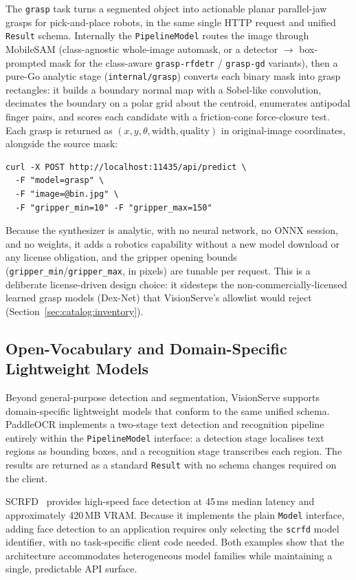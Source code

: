 The \texttt{grasp} task turns a segmented object into actionable planar parallel-jaw grasps for
pick-and-place robots, in the same single HTTP request and unified \texttt{Result} schema.
Internally the \texttt{PipelineModel} routes the image through MobileSAM (class-agnostic
whole-image automask, or a detector $\to$ box-prompted mask for the class-aware
\texttt{grasp-rfdetr} / \texttt{grasp-gd} variants), then a pure-Go analytic stage
(\texttt{internal/grasp}) converts each binary mask into grasp rectangles: it builds a boundary
normal map with a Sobel-like convolution, decimates the boundary on a polar grid about the
centroid, enumerates antipodal finger pairs, and scores each candidate with a friction-cone
force-closure test. Each grasp is returned as $(x,y,\theta,\text{width},\text{quality})$ in
original-image coordinates, alongside the source mask:

{\footnotesize\begin{verbatim}
curl -X POST http://localhost:11435/api/predict \
  -F "model=grasp" \
  -F "image=@bin.jpg" \
  -F "gripper_min=10" -F "gripper_max=150"
\end{verbatim}}

\noindent
Because the synthesizer is analytic, with no neural network, no ONNX session, and no weights, it adds a
robotics capability without a new model download or any license obligation, and the gripper
opening bounds (\texttt{gripper\_min}/\texttt{gripper\_max}, in pixels) are tunable per request.
This is a deliberate license-driven design choice: it sidesteps the non-commercially-licensed
learned grasp models (Dex-Net) that VisionServe's allowlist would reject
(Section~\ref{sec:catalog:inventory}).

\subsection{Open-Vocabulary and Domain-Specific Lightweight Models}
\label{subsec:open-vocab-domain}

Beyond general-purpose detection and segmentation, VisionServe supports
domain-specific lightweight models that conform to the same unified schema. PaddleOCR
\cite{du2020ppocr} implements a two-stage text detection and recognition pipeline
entirely within the \texttt{PipelineModel} interface: a detection stage localises text
regions as bounding boxes, and a recognition stage transcribes each region. The results
are returned as a standard \texttt{Result} with no schema changes required on the client.

SCRFD~\cite{guo2021scrfd} provides high-speed face detection at 45\,ms median latency
and approximately 420\,MB VRAM. Because it implements the plain \texttt{Model}
interface, adding face detection to an application requires only selecting the
\texttt{scrfd} model identifier, with no task-specific client code needed. Both examples
show that the architecture accommodates heterogeneous model families while
maintaining a single, predictable API surface.
